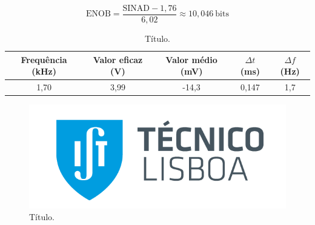
\vspace*{-0.3cm}
\begin{equation}
    \text{ENOB} = \frac{\text{SINAD} - 1,76}{6,02} \approx 10,046\:\text{bits}
    \label{eq:exemplo}
\end{equation}


\vspace*{0.2cm}
\begin{table}[H]
    \centering
    \caption{Título.}
    \label{tab:exemplo}
    \begin{tabular}{|c|c|c|c|c|}
    \hline
    \cellcolor[HTML]{EFEFEF} Frequência (kHz)   &  \cellcolor[HTML]{EFEFEF} Valor eficaz (V) & \cellcolor[HTML]{EFEFEF} Valor médio (mV) &\cellcolor[HTML]{EFEFEF} $\Delta t$ (ms) & \cellcolor[HTML]{EFEFEF} $\Delta f$ (Hz) \\ \hline
     1,70     & 3,99 & -14,3 & 0,147 & 1,7    \\ \hline
    \end{tabular}
\end{table}


\begin{figure}[H]
    \centering
    \includegraphics[scale = 0.6]{imagens/ist.png} 
    \caption{Título.}
    \label{fig:exemplo.1}
\end{figure}


